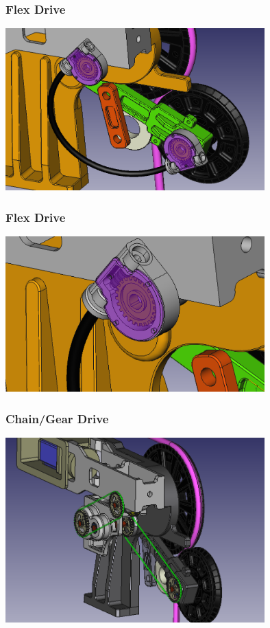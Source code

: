 \documentclass{beamer}
\begin{document}
\begin{frame}
\frametitle{Flex Drive}
\centering\includegraphics[width=10cm]{newurm1.png}
\end{frame}

\begin{frame}
\frametitle{Flex Drive}
\centering
\includegraphics[width=10cm]{newurm3.png}
\end{frame}

\begin{frame}
\frametitle{Chain/Gear Drive}
\centering\includegraphics[width=10cm]{URM1.png}
\end{frame}
\end{document}
